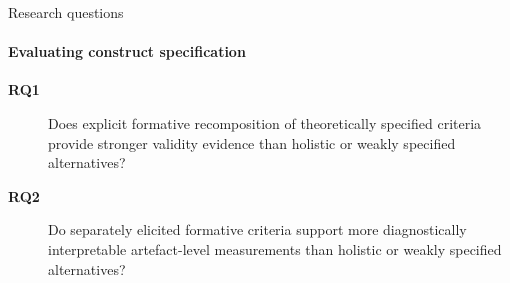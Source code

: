 \begin{frame}{Research questions}
\framesubtitle{Evaluating construct specification}

\begin{description}
    \item[\textbf{RQ1}] Does explicit formative recomposition of theoretically specified criteria provide stronger validity evidence than holistic or weakly specified alternatives?

    \vspace{0.25cm}

    \item[\textbf{RQ2}] Do separately elicited formative criteria support more diagnostically interpretable artefact-level measurements than holistic or weakly specified alternatives?
\end{description}

\vspace{0.35cm}


\end{frame}